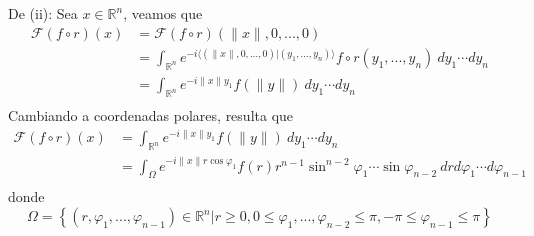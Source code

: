 \documentclass[12pt]{report}
\theoremstyle{largebreak}
\renewcommand{\leq}{\ensuremath{\leqslant}}
\renewcommand{\geq}{\ensuremath{\geqslant}}
\newcommand\norm[1]{\ensuremath{\|#1\|}}
\newcommand\pint[2]{\ensuremath{\langle#1| #2\rangle}}
\newcommand{\fou}[1]{\ensuremath{\mathcal{F}#1}}
\begin{document}
\begin{sol}
        De (ii): Sea $x\in\mathbb{R}^n$, veamos que
        \begin{equation*}
            \begin{split}
                \fou{(f\circ r)}(x)&=\fou{(f\circ r)}(\norm{x},0,...,0)\\
                &=\int_{\mathbb{R}^n}e^{-i\pint{(\norm{x},0,...,0)}{(y_1,...,y_n)}}f\circ r(y_1,...,y_n)\:dy_1\cdots dy_n\\
                &=\int_{\mathbb{R}^n}e^{ -i\norm{x}y_1}f(\norm{y})\:dy_1\cdots dy_n\\
            \end{split}
        \end{equation*}
        Cambiando a coordenadas polares, resulta que
        \begin{equation*}
            \begin{split}
                \fou{(f\circ r)}(x)&=\int_{\mathbb{R}^n}e^{ -i\norm{x}y_1}f(\norm{y})\:dy_1\cdots dy_n\\
                &=\int_{\Omega}e^{ -i\norm{x}r\cos\varphi_1}f(r)r^{ n-1}\sin^{ n-2}\varphi_1\cdots\sin\varphi_{ n-2} \: drd\varphi_1\cdots d\varphi_{ n-1}\\
            \end{split}
        \end{equation*}
        donde
        \begin{equation*}
            \Omega=\left\{(r,\varphi_1,...,\varphi_{ n-1})\in\mathbb{R}^n\Big|r\geq0,0\leq\varphi_1,...,\varphi_{ n-2}\leq\pi,-\pi\leq\varphi_{ n-1}\leq\pi \right\}
        \end{equation*}

    \end{sol}
\end{document}
